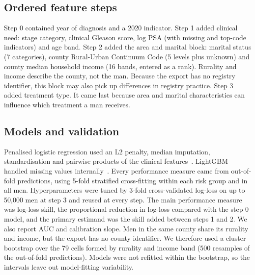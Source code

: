 \documentclass[10pt,a4paper,twocolumn]{article}
\begin{document}
\subsection{Ordered feature steps}
Step 0 contained year of diagnosis and a 2020 indicator. Step 1 added clinical need: stage category, clinical Gleason score, log PSA (with missing and top-code indicators) and age band. Step 2 added the area and marital block: marital status (7 categories), county Rural-Urban Continuum Code (5 levels plus unknown) and county median household income (16 bands, entered as a rank). Rurality and income describe the county, not the man. Because the export has no registry identifier, this block may also pick up differences in registry practice. Step 3 added treatment type. It came last because area and marital characteristics can influence which treatment a man receives.

\subsection{Models and validation}
Penalised logistic regression used an L2 penalty, median imputation, standardisation and pairwise products of the clinical features~\cite{pedregosa2011}. LightGBM handled missing values internally~\cite{ke2017}. Every performance measure came from out-of-fold predictions, using 5-fold stratified cross-fitting within each risk group and in all men. Hyperparameters were tuned by 3-fold cross-validated log-loss on up to 50,000 men at step 3 and reused at every step. The main performance measure was log-loss skill, the proportional reduction in log-loss compared with the step 0 model, and the primary estimand was the skill added between steps 1 and 2. We also report AUC and calibration slope. Men in the same county share its rurality and income, but the export has no county identifier. We therefore used a cluster bootstrap over the 79 cells formed by rurality and income band (500 resamples of the out-of-fold predictions). Models were not refitted within the bootstrap, so the intervals leave out model-fitting variability.
\end{document}
